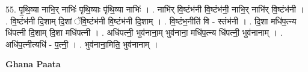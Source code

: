 \documentclass[17pt]{extarticle}
\begin{document}
55. पृ॒थि॒व्या नाभि॒र् नाभिः॑ पृथि॒व्याः पृ॑थि॒व्या नाभिः॑ । . नाभि॑र् वि॒ष्टंभ॑नी वि॒ष्टंभ॑नी॒ नाभि॒र् नाभि॑र् वि॒ष्टंभ॑नी । . वि॒ष्टंभ॑नी दि॒शाम् दि॒शां ॅवि॒ष्टंभ॑नी वि॒ष्टंभ॑नी दि॒शाम् । . वि॒ष्टंभ॒नीति॑ वि - स्तंभ॑नी । . दि॒शा मधि॑प॒त्न्य धि॑पत्नी दि॒शाम् दि॒शा मधि॑पत्नी । . अधि॑पत्नी॒ भुव॑नाना॒म् भुव॑नाना॒ मधि॑प॒त्न्य धि॑पत्नी॒ भुव॑नानाम् । . अधि॑प॒त्नीत्यधि॑ - प॒त्नी॒ । . भुव॑नाना॒मिति॒ भुव॑नानाम् । \newline

\textbf{Ghana Paata } \newline
\end{document}
